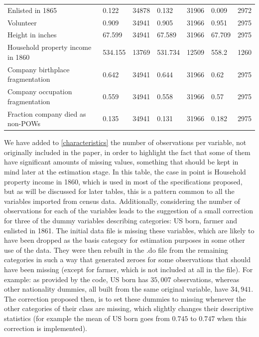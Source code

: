 \documentclass{article}
\begin{document}
\begin{table}[bt]
\begin{tabular}{lllllll}
Enlisted in 1865                  & 0.122   & 34878 & 0.132   & 31906 & 0.009  & 2972 \\
Volunteer                         & 0.909   & 34941 & 0.905   & 31966 & 0.951  & 2975 \\
Height in inches                  & 67.599  & 34941 & 67.589  & 31966 & 67.709 & 2975 \\
Household property income in 1860 & 534.155 & 13769 & 531.734 & 12509 & 558.2  & 1260 \\
Company birthplace fragmentation  & 0.642   & 34941 & 0.644   & 31966 & 0.62   & 2975 \\
Company occupation fragmentation  & 0.559   & 34941 & 0.558   & 31966 & 0.57   & 2975 \\
Fraction company died as non-POWs & 0.135   & 34941 & 0.131   & 31966 & 0.182  & 2975 \\
\end{tabular}
\end{table}

We have added to \autoref{characteristics} the number of observations per variable, not originally included in the paper, in order to highlight the fact that some of them have significant amounts of missing values, something that should be kept in mind later at the estimation stage. In this table, the case in point is Household property income in 1860, which is used in most of the specifications proposed, but as will be discussed for later tables, this is a pattern common to all the variables imported from census data. 
Additionally, considering the number of observations for each of the variables leads to the suggestion of a small correction for three of the dummy variables describing categories: US born, farmer and enlisted in 1861. The initial data file is missing these variables, which are likely to have been dropped as the basis category for estimation purposes in some other use of the data. They were then rebuilt in the .do file from the remaining categories in such a way that generated zeroes for some observations that should have been missing (except for farmer, which is not included at all in the file). For example: as provided by the code, US born has $35,007$ observations, whereas other nationality dummies, all built from the same original variable, have $34,941$. The correction proposed then, is to set these dummies to missing whenever the other categories of their class are missing, which slightly changes their descriptive statistics (for example the mean of US born goes from $0.745$ to $0.747$ when this correction is implemented).
\end{document}
